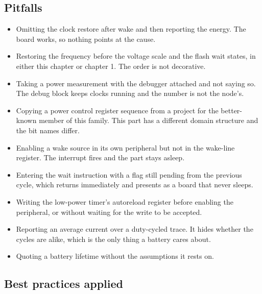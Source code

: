\subsection*{Pitfalls}

\begin{itemize}
\item Omitting the clock restore after wake and then reporting the energy. The
board works, so nothing points at the cause.
\item Restoring the frequency before the voltage scale and the flash wait
states, in either this chapter or chapter 1. The order is not decorative.
\item Taking a power measurement with the debugger attached and not saying so.
The debug block keeps clocks running and the number is not the node's.
\item Copying a power control register sequence from a project for the
better-known member of this family. This part has a different domain structure
and the bit names differ.
\item Enabling a wake source in its own peripheral but not in the wake-line
register. The interrupt fires and the part stays asleep.
\item Entering the wait instruction with a flag still pending from the previous
cycle, which returns immediately and presents as a board that never sleeps.
\item Writing the low-power timer's autoreload register before enabling the
peripheral, or without waiting for the write to be accepted.
\item Reporting an average current over a duty-cycled trace. It hides whether
the cycles are alike, which is the only thing a battery cares about.
\item Quoting a battery lifetime without the assumptions it rests on.
\end{itemize}

\subsection*{Best practices applied}

